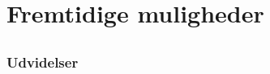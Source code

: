 \documentclass[xcolor=table]{beamer}
\begin{document}
\section{Fremtidige muligheder}

\subsection*{}

\begin{frame}

  \frametitle{Udvidelser}

\end{frame}





\end{document}
